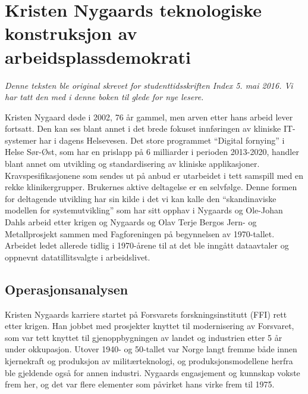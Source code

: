 \documentclass[../../main.tex]{subfiles}
\begin{document}
	
\chapter[Kristen Nygaard]{Kristen Nygaards teknologiske konstruksjon av arbeidsplassdemokrati}

\author{Av Egil Øvrelid}

\emph{Denne teksten ble original skrevet for studenttidsskriften Index 5. mai 2016. Vi har tatt den med i denne boken til glede for nye lesere.}


Kristen Nygaard døde i 2002, 76 år gammel, men arven etter hans arbeid lever fortsatt. Den kan ses blant annet i det brede fokuset innføringen av kliniske IT-systemer har i dagens Helsevesen. Det store programmet ``Digital fornying'' i Helse Sør-Øst, som har en prislapp på 6 milliarder i perioden 2013-2020, handler blant annet om utvikling og standardisering av kliniske applikasjoner. Kravspesifikasjonene som sendes ut på anbud er utarbeidet i tett samspill med en rekke klinikergrupper. Brukernes aktive deltagelse er en selvfølge. Denne formen for deltagende utvikling har sin kilde i det vi kan kalle den ``skandinaviske modellen for systemutvikling'' som har sitt opphav i Nygaards og Ole-Johan Dahls arbeid etter krigen og Nygaards og Olav Terje Bergos Jern- og Metallprosjekt sammen med Fagforeningen på begynnelsen av 1970-tallet. Arbeidet ledet allerede tidlig i 1970-årene til at det ble inngått dataavtaler og oppnevnt datatillitsvalgte i arbeidslivet. 

\section{Operasjonsanalysen}

Kristen Nygaards karriere startet på Forsvarets forskningsinstitutt (FFI) rett etter krigen. Han jobbet med prosjekter knyttet til modernisering av Forsvaret, som var tett knyttet til gjenoppbygningen av landet og industrien etter 5 år under okkupasjon. Utover 1940- og 50-tallet var Norge langt fremme både innen kjernekraft og produksjon av militærteknologi, og produksjonsmodellene herfra ble gjeldende også for annen industri. Nygaards engasjement og kunnskap vokste frem her, og det var flere elementer som påvirket hans virke frem til 1975.
\end{document}
